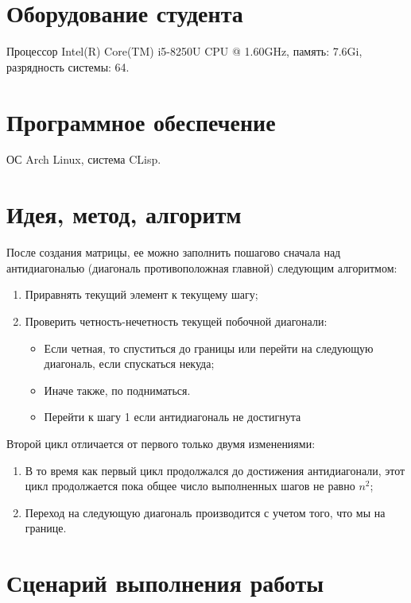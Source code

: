 \documentclass[12pt]{article}
\begin{document}
\section{Оборудование студента}
Процессор Intel(R) Core(TM) i5-8250U CPU @ 1.60GHz, память: 7.6Gi, разрядность системы: 64.

\section{Программное обеспечение}
ОС Arch Linux, система CLisp.

\section{Идея, метод, алгоритм}

После создания матрицы, ее можно заполнить пошагово сначала над антидиагональю (диагональ
противоположная главной) следующим алгоритмом:

\begin{enumerate}
    \item Приравнять текущий элемент к текущему шагу;
    \item Проверить четность-нечетность текущей побочной диагонали:
    \begin{itemize}
        \item Если четная, то спуститься до границы или перейти на следующую диагональ,
        если спускаться некуда;
        \item Иначе также, по подниматься.
    \item Перейти к шагу 1 если антидиагональ не достигнута
    \end{itemize}
\end{enumerate}

Второй цикл отличается от первого только двумя изменениями:

\begin{enumerate}
    \item В то время как первый цикл продолжался до достижения антидиагонали, этот
    цикл продолжается пока общее число выполненных шагов не равно $n^2$;
    \item Переход на следующую диагональ производится с учетом того, что мы на границе.
\end{enumerate}

\section{Сценарий выполнения работы}
\end{document}
